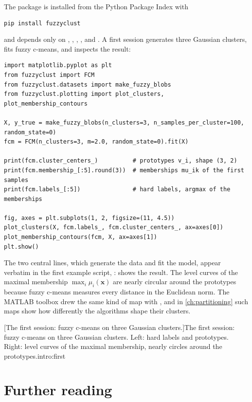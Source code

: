 The package is installed from the Python Package Index with
\begin{lstlisting}[language=bash]
pip install fuzzyclust
\end{lstlisting}
and depends only on , , , , and . A first session generates three Gaussian clusters, fits fuzzy c-means, and inspects the result:
\begin{lstlisting}
import matplotlib.pyplot as plt
from fuzzyclust import FCM
from fuzzyclust.datasets import make_fuzzy_blobs
from fuzzyclust.plotting import plot_clusters, plot_membership_contours

X, y_true = make_fuzzy_blobs(n_clusters=3, n_samples_per_cluster=100, random_state=0)
fcm = FCM(n_clusters=3, m=2.0, random_state=0).fit(X)

print(fcm.cluster_centers_)          # prototypes v_i, shape (3, 2)
print(fcm.membership_[:5].round(3))  # memberships mu_ik of the first samples
print(fcm.labels_[:5])               # hard labels, argmax of the memberships

fig, axes = plt.subplots(1, 2, figsize=(11, 4.5))
plot_clusters(X, fcm.labels_, fcm.cluster_centers_, ax=axes[0])
plot_membership_contours(fcm, X, ax=axes[1])
plt.show()
\end{lstlisting}
The two central lines, which generate the data and fit the model, appear verbatim in the first example script, :
 shows the result. The level curves of the maximal membership $\max_i\mu_i(\mathbf{x})$ are nearly circular around the prototypes because fuzzy c-means measures every distance in the Euclidean norm. The MATLAB toolbox drew the same kind of map with , and in \cref{ch:partitioning} such maps show how differently the algorithms shape their clusters.

[The first session: fuzzy c-means on three Gaussian clusters.]{The first session: fuzzy c-means on three Gaussian clusters. Left: hard labels and prototypes. Right: level curves of the maximal membership, nearly circles around the prototypes.}{intro:first}

\section{Further reading}\label{sec:intro:reading-further}
\enlargethispage{2\baselineskip}%

